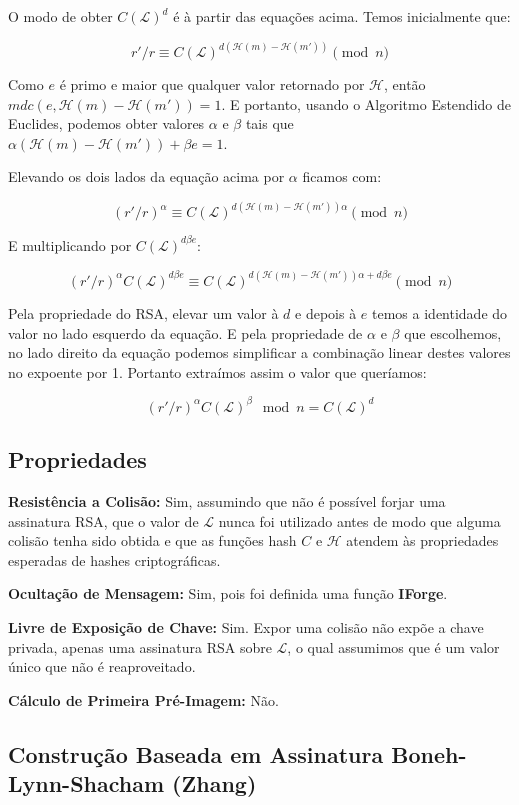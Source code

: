 \documentclass[a4paper]{article}
\begin{document}
O modo de obter $C(\mathcal{L})^d$ é à partir das equações
acima. Temos inicialmente que:

$$
r'/r \equiv C(\mathcal{L})^{d(\mathcal{H}(m)-\mathcal{H}(m'))} \pmod n
$$

Como $e$ é primo e maior que qualquer valor retornado por
$\mathcal{H}$, então $mdc(e, \mathcal{H}(m)-\mathcal{H}(m')) = 1$. E
portanto, usando o Algoritmo Estendido de Euclides, podemos obter
valores $\alpha$ e $\beta$ tais que
$\alpha(\mathcal{H}(m)-\mathcal{H}(m'))+\beta e = 1$.

Elevando os dois lados da equação acima por $\alpha$ ficamos com:

$$
(r'/r)^\alpha \equiv C(\mathcal{L})^{d(\mathcal{H}(m)-\mathcal{H}(m'))\alpha} \pmod n
$$

E multiplicando por $C(\mathcal{L})^{d\beta e}$:

$$
(r'/r)^\alpha C(\mathcal{L})^{d\beta e} \equiv C(\mathcal{L})^{d(\mathcal{H}(m)-\mathcal{H}(m'))\alpha + d\beta e} \pmod n
$$

Pela propriedade do RSA, elevar um valor à $d$ e depois à $e$ temos a
identidade do valor no lado esquerdo da equação. E pela propriedade de
$\alpha$ e $\beta$ que escolhemos, no lado direito da equação podemos
simplificar a combinação linear destes valores no expoente por
1. Portanto extraímos assim o valor que queríamos:

$$
(r'/r)^\alpha C(\mathcal{L})^{\beta} \mod n= C(\mathcal{L})^d
$$

\subsection{Propriedades}

\textbf{Resistência a Colisão: }Sim, assumindo que não é possível
forjar uma assinatura RSA, que o valor de $\mathcal{L}$ nunca foi
utilizado antes de modo que alguma colisão tenha sido obtida e que as
funções hash $C$ e $\mathcal{H}$ atendem às propriedades esperadas de
hashes criptográficas.

\textbf{Ocultação de Mensagem: }Sim, pois foi definida uma função
\textbf{IForge}.

\textbf{Livre de Exposição de Chave: } Sim. Expor uma colisão não
expõe a chave privada, apenas uma assinatura RSA sobre $\mathcal{L}$,
o qual assumimos que é um valor único que não é reaproveitado.
  
\textbf{Cálculo de Primeira Pré-Imagem: }Não.

\subsection{Construção Baseada em Assinatura Boneh-Lynn-Shacham (Zhang) \cite{zhang}}
\end{document}
